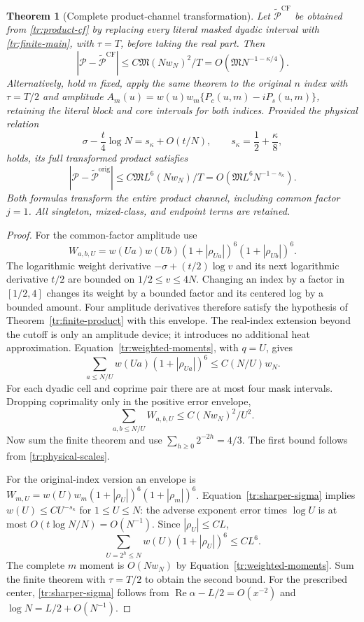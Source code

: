\documentclass[11pt]{article}
\numberwithin{equation}{section}
\newtheorem{theorem}{Theorem}[section]
\theoremstyle{definition}
\theoremstyle{remark}
\begin{document}
\begin{theorem}[Complete product-channel transformation]
\label{tr:global-product}
Let $\widetilde{\mathcal P}^{\mathrm{CF}}$ be obtained from
\eqref{tr:product-cf} by replacing every literal masked dyadic interval
with \eqref{tr:finite-main}, with $\tau=T$, before taking the real
part.  Then
\[
 |\mathcal P-\widetilde{\mathcal P}^{\mathrm{CF}}|
 \le C\mathfrak M (Nw_N)^2/T
 =O(\mathfrak M N^{-1-\kappa/4}).
\]
Alternatively, hold $m$ fixed, apply the same theorem to the original
$n$ index with $\tau=T/2$ and amplitude
$A_m(u)=w(u)w_m\{P_c(u,m)-iP_s(u,m)\}$, retaining the literal block
and core intervals for both indices.  Provided the physical relation
\begin{equation}
\label{tr:sharper-sigma}
 \sigma-\frac t4\log N=s_\kappa+O(t/N),
 \qquad s_\kappa=\frac12+\frac\kappa8,
\end{equation}
holds, its full transformed product satisfies
\[
 |\mathcal P-\widetilde{\mathcal P}^{\mathrm{orig}}|
 \le C\mathfrak M L^6(Nw_N)/T
 =O(\mathfrak M L^6N^{-1-s_\kappa}).
\]
Both formulas transform the entire product channel, including common
factor $j=1$.  All singleton, mixed-class, and endpoint terms are retained.
\end{theorem}
\begin{proof}
For the common-factor amplitude use
\[
 W_{a,b,U}=w(Ua)w(Ub)
 (1+|\rho_{Ua}|)^6(1+|\rho_{Ub}|)^6.
\]
The logarithmic weight derivative $-\sigma+(t/2)\log v$ and its next
logarithmic derivative $t/2$ are bounded on $1/2\le v\le4N$.
Changing an index by a factor in $[1/2,4]$ changes its weight by a
bounded factor and its centered log by a bounded amount.  Four amplitude
derivatives therefore satisfy the hypothesis of
Theorem~\ref{tr:finite-product} with this envelope.  The real-index
extension beyond the cutoff is only an amplitude device; it introduces
no additional heat approximation.
Equation~\eqref{tr:weighted-moments}, with $q=U$, gives
\[
 \sum_{a\le N/U}w(Ua)(1+|\rho_{Ua}|)^6
 \le C(N/U)w_N.
\]
For each dyadic cell and coprime pair there are at most four mask
intervals.  Dropping coprimality only in the positive error envelope,
\[
 \sum_{a,b\le N/U}W_{a,b,U}\le C(Nw_N)^2/U^2.
\]
Now sum the finite theorem and use $\sum_{h\ge0}2^{-2h}=4/3$.
The first bound follows from \eqref{tr:physical-scales}.

For the original-index version an envelope is
$W_{m,U}=w(U)w_m(1+|\rho_U|)^6(1+|\rho_m|)^6$.
Equation~\eqref{tr:sharper-sigma} implies $w(U)\le CU^{-s_\kappa}$
for $1\le U\le N$: the adverse exponent error times $\log U$ is at
most $O(t\log N/N)=O(N^{-1})$.  Since $|\rho_U|\le CL$,
\[
 \sum_{U=2^h\le N}w(U)(1+|\rho_U|)^6\le CL^6.
\]
The complete $m$ moment is $O(Nw_N)$ by
Equation~\eqref{tr:weighted-moments}.  Sum the finite theorem with
$\tau=T/2$ to obtain the second bound.  For the prescribed center,
\eqref{tr:sharper-sigma} follows from
$\operatorname{Re}\alpha-L/2=O(x^{-2})$ and
$\log N=L/2+O(N^{-1})$.
\end{proof}
\end{document}

